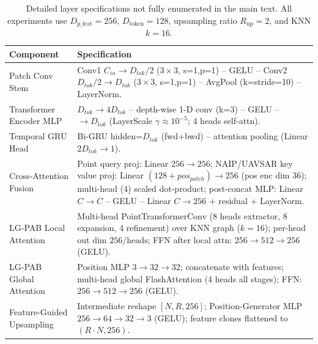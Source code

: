 \documentclass[remotesensing,article,accept,pdftex,moreauthors]{Definitions/mdpi}
\begin{document}
\appendixstart
\appendix
\section[\appendixname~\thesection]{\label{app1}}

\begin{table}[H]
  \centering
  \caption{Detailed layer specifications not fully enumerated in the main text. All experiments use $D_{\text{p\_feat}}=256$, $D_{\text{token}}=128$, upsampling ratio $R_{\text{up}}=2$, and KNN $k=16$.}
  \label{tab:layer_specs}
  \small
  \begin{tabular}{p{3.2cm} p{10.8cm}}
    \toprule
    Component & Specification \\
    \midrule
    Patch Conv Stem & Conv1 $C_{in}\rightarrow D_{tok}/2$ ($3\times3$, s=1,p=1) – GELU – Conv2 $D_{tok}/2\rightarrow D_{tok}$ ($3\times3$, s=1,p=1) – AvgPool (k=stride=10) – LayerNorm. \\
    \addlinespace
    Transformer Encoder MLP & $D_{tok} \rightarrow 4D_{tok}$ – depth-wise 1-D conv (k=3) – GELU – $\rightarrow D_{tok}$ (LayerScale $\gamma\approx10^{-5}$; 4 heads self-attn). \\
    \addlinespace
    Temporal GRU Head & Bi-GRU hidden=$D_{tok}$ (fwd+bwd) – attention pooling (Linear $2D_{tok}\rightarrow1$). \\
    \addlinespace
    Cross-Attention Fusion & Point query proj: Linear $256\rightarrow256$; NAIP/UAVSAR key \/ value proj: Linear $(128+pos_{patch})\rightarrow256$ (pos enc dim 36); multi-head (4) scaled dot-product; post-concat MLP: Linear $C\rightarrow C$ – GELU – Linear $C\rightarrow256$ + residual + LayerNorm. \\
    \addlinespace
    LG-PAB Local Attention & Multi-head PointTransformerConv (8 heads extractor, 8 expansion, 4 refinement) over KNN graph ($k=16$); per-head out dim $256/\text{heads}$; FFN after local attn: $256\rightarrow512\rightarrow256$ (GELU). \\
    \addlinespace
    LG-PAB Global Attention & Position MLP $3\rightarrow32\rightarrow32$; concatenate with features; multi-head global FlashAttention (4 heads all stages); FFN: $256\rightarrow512\rightarrow256$ (GELU). \\
    \addlinespace
    Feature-Guided Upsampling & Intermediate reshape $[N,R,256]$; Position-Generator MLP $256\rightarrow64\rightarrow32\rightarrow3$ (GELU); feature clones flattened to $(R\cdot N,256)$. \\

\end{tabular}
\end{table}
\end{document}
